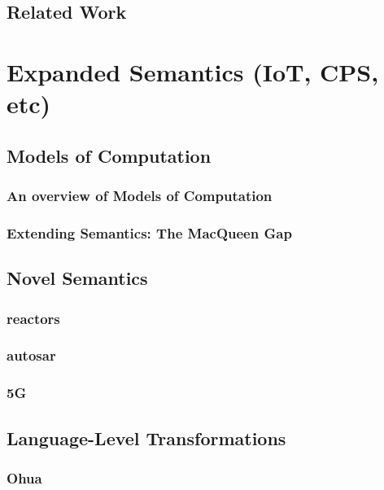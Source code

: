 \documentclass{report}
\begin{document}
\chapter{Related Work}



\part{Expanded Semantics (IoT, CPS, etc)}


\chapter{Models of Computation}
\label{chap:mocs}

\section{An overview of Models of Computation}

\section{Extending Semantics: The MacQueen Gap} %

\chapter{Novel Semantics}

\section{reactors}
\section{autosar}
\section{5G}

\chapter{Language-Level Transformations}
\section{Ohua}
 
\end{document}

